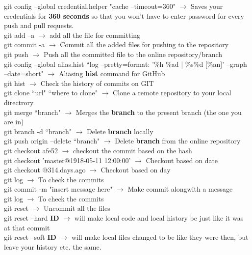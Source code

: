 \documentclass[twoside,a4paper]{article}
\newcommand{\tcb}{\color{blue}}
\newcommand{\tcr}{\color{red}}
\newcommand{\tck}{\color{black}}
\newcommand{\ra }{$\rightarrow$ }
\newcommand{\hs}{\hspace}
\begin{document}
\begin{multicols}{2}
	\hs{-0.8 cm} \tcr  git config --global credential.helper
	 "cache --timeout=360" \tck \ra Saves your credentials
	 for \textbf{360 seconds} so that you won't have to enter password for
	 every push and pull requests.\\
	\tcr git add --a \tck \ra add all the
	 file for committing\\
	\tcr git commit -a \tck \ra Commit all the added
	 files for pushing to the repository \\
	\tcr git push \tck \ra Push all the committed 
	 file to the online repository/branch \\
	\tcr git \tcb config --global alias.hist 
	``log --pretty=format: '\%h \%ad | \%s\%d [\%an]' --graph --date=short"
	\tck \ra Aliasing \textbf{hist} command for GitHub\\
	\tcr git hist \tck \ra Check the history of
	commits on GIT\\
	\tcr git clone \tcb ``url" ``where to clone" 
	\tck  \ra Clone a remote repository to your local 
	directrory\\
	\tcr git merge \tcb ``branch" \tck $\rightarrow$
	Merges the \textbf{branch} to the present branch (the one you are in)\\
	\tcr git branch \tcb -d ``branch" \tck 
	\ra Delete \textbf{branch} locally\\
	\tcr git push \tcb origin --delete ``branch" \tck 
	\ra Delete \textbf{branch} from the online repository\\
	\tcr git checkout \tcb afe52 \tck \ra 
	checkout the commit based on the hash\\
	\tcr git checkout \tcb 'master@{1918-05-11 12:00:00}' 
	\tck \ra Checkout based on date\\
	\tcr git checkout \tcb @{314.days.ago}
	\tck \ra Checkout based on day\\
	\tcr git log \tck \ra To check the commits\\
	\tcr git commit \tcb -m "insert message here"\tck 
	\ra Make commit alongwith a message\\
	\tcr git log \tck \ra To check the commits\\
	\tcr git reset \tck \ra Uncommit all the files\\
	\tcr git reset \tcb --hard \textbf{ID} \tck 
	\ra will make local code and local history be just like it
	was at that commit\\
	\tcr git reset \tcb --soft \textbf{ID} \tck 
	\ra will make local files changed to be like they were then,
	but leave your history etc. the same.\\

\end{multicols}
\end{document}
